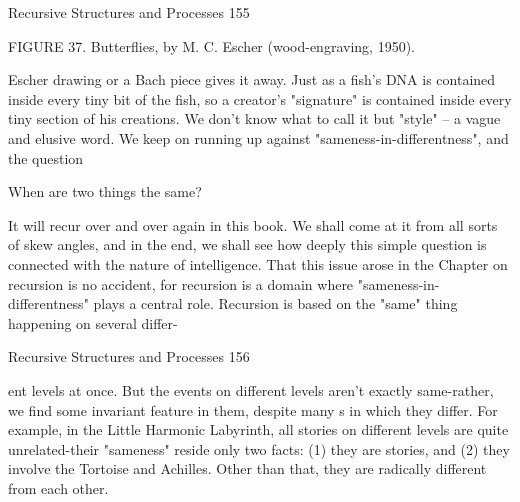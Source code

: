 Recursive Structures and Processes                                                     155

           FIGURE 37. Butterflies, by M. C. Escher (wood-engraving, 1950).

Escher drawing or a Bach piece gives it away. Just as a fish's DNA is contained inside
every tiny bit of the fish, so a creator's "signature" is contained inside every tiny section
of his creations. We don't know what to call it but "style" -- a vague and elusive word.
        We keep on running up against "sameness-in-differentness", and the question

                       When are two things the same?

It will recur over and over again in this book. We shall come at it from all sorts of skew
angles, and in the end, we shall see how deeply this simple question is connected with the
nature of intelligence.
         That this issue arose in the Chapter on recursion is no accident, for recursion is a
domain where "sameness-in-differentness" plays a central role. Recursion is based on the
"same" thing happening on several differ-




Recursive Structures and Processes                                                       156

ent levels at once. But the events on different levels aren't exactly same-rather, we find
some invariant feature in them, despite many s in which they differ. For example, in the
Little Harmonic Labyrinth, all stories on different levels are quite unrelated-their
"sameness" reside only two facts: (1) they are stories, and (2) they involve the Tortoise
and Achilles. Other than that, they are radically different from each other.

